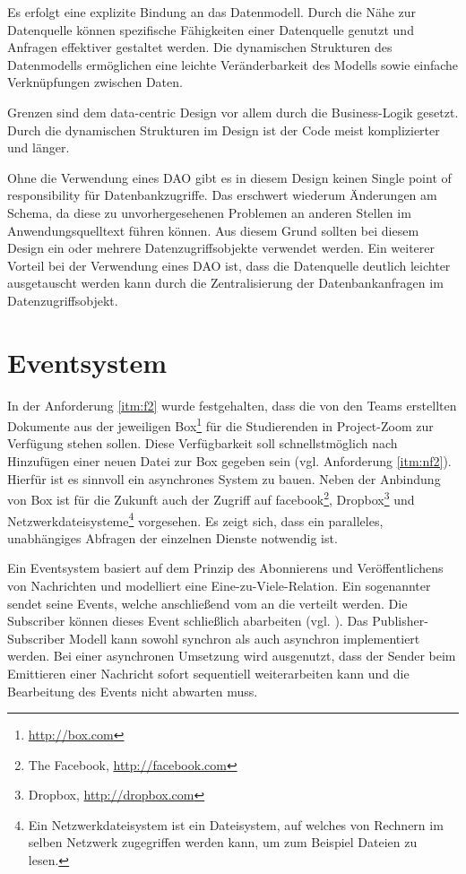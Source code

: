 Es erfolgt eine explizite Bindung an das Datenmodell. Durch die Nähe zur Datenquelle können spezifische Fähigkeiten einer Datenquelle genutzt und Anfragen effektiver gestaltet werden. Die dynamischen Strukturen des Datenmodells ermöglichen eine leichte Veränderbarkeit des Modells sowie einfache Verknüpfungen zwischen Daten.

Grenzen sind dem data-centric Design vor allem durch die Business-Logik gesetzt. Durch die dynamischen Strukturen im Design ist der Code meist komplizierter und länger.

Ohne die Verwendung eines DAO gibt es in diesem Design keinen Single point of responsibility für Datenbankzugriffe. Das erschwert wiederum Änderungen am Schema, da diese zu unvorhergesehenen Problemen an anderen Stellen im Anwendungsquelltext führen können. Aus diesem Grund sollten bei diesem Design ein oder mehrere Datenzugriffsobjekte verwendet werden. Ein weiterer Vorteil bei der Verwendung eines DAO ist, dass die Datenquelle deutlich leichter ausgetauscht werden kann durch die Zentralisierung der Datenbankanfragen im Datenzugriffsobjekt.


\section{Eventsystem}
In der Anforderung \ref{itm:f2} wurde festgehalten, dass die von den Teams erstellten Dokumente aus der jeweiligen \gls{Box}\footnote{\url{http://box.com}} für die Studierenden in Project-Zoom zur Verfügung stehen sollen. Diese Verfügbarkeit soll schnellstmöglich nach Hinzufügen einer neuen Datei zur \gls{Box} gegeben sein (vgl. Anforderung \ref{itm:nf2}). Hierfür ist es sinnvoll ein asynchrones System zu bauen.  Neben der Anbindung von \gls{Box} ist für die Zukunft auch der Zugriff auf facebook\footnote{The Facebook, \url{http://facebook.com}}, Dropbox\footnote{Dropbox, \url{http://dropbox.com}} und Netzwerkdateisysteme\footnote{Ein Netzwerkdateisystem ist ein Dateisystem, auf welches von Rechnern im selben Netzwerk zugegriffen werden kann, um zum Beispiel Dateien zu lesen.} vorgesehen. Es zeigt sich, dass ein paralleles, unabhängiges Abfragen der einzelnen Dienste notwendig ist.

Ein Eventsystem basiert auf dem Prinzip des Abonnierens und Veröffentlichens von Nachrichten und modelliert eine Eine-zu-Viele-Relation. Ein sogenannter  sendet seine Events, welche anschließend vom  an die  verteilt werden. Die Subscriber können dieses Event schließlich abarbeiten (vgl. \cite[p.~327]{gang-of-four}). Das Publisher-Subscriber Modell kann sowohl synchron als auch asynchron implementiert werden. Bei einer asynchronen Umsetzung wird ausgenutzt, dass der Sender beim Emittieren einer Nachricht sofort sequentiell weiterarbeiten kann und die Bearbeitung des Events nicht abwarten muss.

